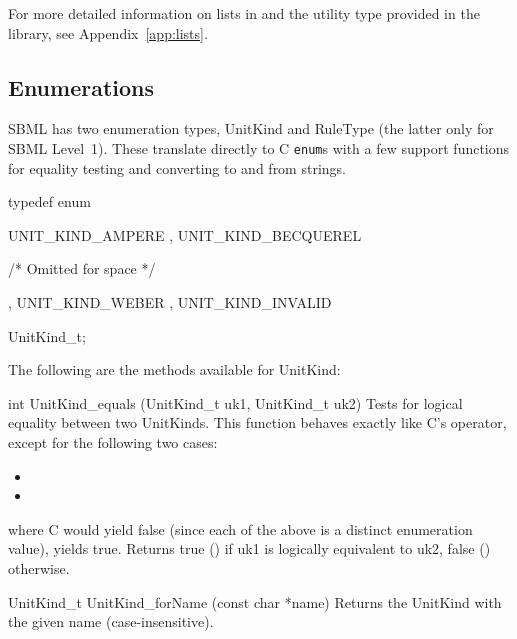 \documentclass{sbmlmanual}
\begin{document}
For more detailed information on lists in \libsbml{} and the
 utility type provided in the library, see
Appendix~\ref{app:lists}.


\subsection{Enumerations}
\label{sec:enumerations}

SBML has two enumeration types, UnitKind and RuleType (the latter only for
SBML Level~1).  These translate directly to C \texttt{enum}s with a few
support functions for equality testing and converting to and from strings.


\begin{cVerbatim}
  typedef enum
  {
      UNIT_KIND_AMPERE
    , UNIT_KIND_BECQUEREL
  
     /* Omitted for space */
  
    , UNIT_KIND_WEBER
    , UNIT_KIND_INVALID
  } UnitKind_t;
  \end{cVerbatim}

The following are the methods available for UnitKind:

\begin{methoddef}{int UnitKind\_equals (UnitKind\_t uk1, UnitKind\_t uk2)}
  Tests for logical equality between two UnitKinds.  This function behaves
  exactly like C's \code{==} operator, except for the following two cases:

\begin{itemize}
  \item {}
  \item {}
\end{itemize}

  where C would yield false (since each of the above is a distinct
  enumeration value),  yields true.
  Returns true () if uk1 is logically equivalent to uk2, false
  () otherwise.
\end{methoddef}
  
\begin{methoddef}{UnitKind\_t UnitKind\_forName (const char *name)}
  Returns the UnitKind with the given name (case-insensitive).
\end{methoddef}
\end{document}
